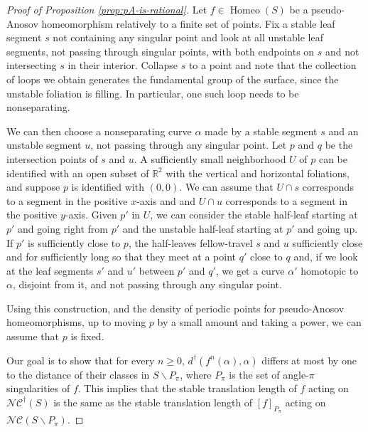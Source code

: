\documentclass{amsart}
\newcommand{\R}{\mathbb{R}}
\newcommand{\NC}{\mathcal{NC}}
\newcommand{\NCdagger}{\NC^\dagger}
\DeclareMathOperator{\Homeo}{Homeo}
\newcommand{\ssm}{\smallsetminus}
\newcommand{\distdagger}{d^\dagger}
\theoremstyle{definition}
\begin{document}
\begin{proof}[Proof of Proposition \ref{prop:pA-is-rational}]
Let \(f\in\Homeo(S)\) be a pseudo-Anosov homeomorphism relatively to a finite set of points.  Fix a stable leaf segment \(s\) not containing any singular point and look at all unstable leaf segments, not passing through singular points, with both endpoints on \(s\) and not intersecting \(s\) in their interior. Collapse \(s\) to a point and note that the collection of loops we obtain generates the fundamental group of the surface, since the unstable foliation is filling. In particular, one such loop needs to be nonseparating.

We can then choose a nonseparating curve \(\alpha\) made by a stable segment \(s\) and an unstable segment \(u\), not passing through any singular point. Let \(p\) and \(q\) be the intersection points of \(s\) and \(u\). A sufficiently small neighborhood \(U\) of \(p\) can be identified with an open subset of \(\R^2\) with the vertical and horizontal foliations, and suppose \(p\) is identified with \((0,0)\). We can assume that \(U\cap s\) corresponds to a segment in the positive \(x\)-axis and and \(U\cap u\) corresponds to a segment in the positive \(y\)-axis. Given \(p'\) in \(U\), we can consider the stable half-leaf starting at \(p'\) and going right from \(p'\) and the unstable half-leaf starting at \(p'\) and going up. If \(p'\) is sufficiently close to \(p\), the half-leaves fellow-travel \(s\) and \(u\) sufficiently close and for sufficiently long so that they meet at a point \(q'\) close to \(q\) and, if we look at the leaf segments \(s'\) and \(u'\) between \(p'\) and \(q'\), we get a curve \(\alpha'\) homotopic to \(\alpha\), disjoint from it, and  not passing through any singular point.

Using this construction, and the density of periodic points for pseudo-Anosov homeomorphisms,
up to moving \(p\) by a small amount and taking a power, we can assume that \(p\) is fixed.

Our goal is to show that for every \(n\geq 0\), \(\distdagger(f^n(\alpha),\alpha)\) differs at most by one to the distance of their classes in \(S\ssm P_\pi\), where \(P_\pi\) is the set of angle-\(\pi\) singularities of \(f\). This implies that the stable translation length of \(f\) acting on \(\NCdagger(S)\) is the same as the stable translation length of \([f]_{P_\pi}\) acting on \(\NC(S\ssm P_\pi)\).


\end{proof}
\end{document}
